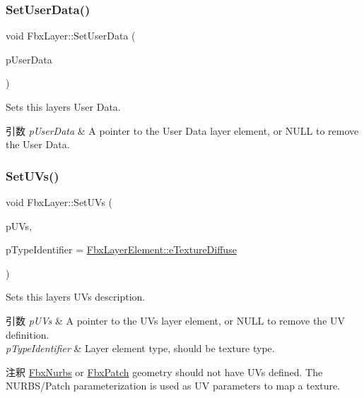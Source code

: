 \subsubsection{\texorpdfstring{Set\+User\+Data()}{SetUserData()}}
{\footnotesize\ttfamily void Fbx\+Layer\+::\+Set\+User\+Data (\begin{DoxyParamCaption}\item[{\hyperlink{class_fbx_layer_element_user_data}{Fbx\+Layer\+Element\+User\+Data} $\ast$}]{p\+User\+Data }\end{DoxyParamCaption})}

Sets this layer\textquotesingle{}s User Data. 
\begin{DoxyParams}{引数}
{\em p\+User\+Data} & A pointer to the User Data layer element, or {\ttfamily N\+U\+LL} to remove the User Data. \\
\hline
\end{DoxyParams}
\mbox{\label{class_fbx_layer_aa0032fabcc4b9a611bf014a14c5777ea}} 
\subsubsection{\texorpdfstring{Set\+U\+Vs()}{SetUVs()}}
{\footnotesize\ttfamily void Fbx\+Layer\+::\+Set\+U\+Vs (\begin{DoxyParamCaption}\item[{\hyperlink{class_fbx_layer_element_u_v}{Fbx\+Layer\+Element\+UV} $\ast$}]{p\+U\+Vs,  }\item[{\hyperlink{class_fbx_layer_element_a8c95c5cd880b56c776acd379bd86f42c}{Fbx\+Layer\+Element\+::\+E\+Type}}]{p\+Type\+Identifier = {\ttfamily \hyperlink{class_fbx_layer_element_a8c95c5cd880b56c776acd379bd86f42ca09829e6ecf512e7ae04d9ad8de1342fa}{Fbx\+Layer\+Element\+::e\+Texture\+Diffuse}} }\end{DoxyParamCaption})}

Sets this layer\textquotesingle{}s U\+Vs description. 
\begin{DoxyParams}{引数}
{\em p\+U\+Vs} & A pointer to the U\+Vs layer element, or {\ttfamily N\+U\+LL} to remove the UV definition. \\
\hline
{\em p\+Type\+Identifier} & Layer element type, should be texture type. \\
\hline
\end{DoxyParams}
\begin{DoxyRemark}{注釈}
\hyperlink{class_fbx_nurbs}{Fbx\+Nurbs} or \hyperlink{class_fbx_patch}{Fbx\+Patch} geometry should not have U\+Vs defined. The N\+U\+R\+B\+S/\+Patch parameterization is used as UV parameters to map a texture. 
\end{DoxyRemark}
\mbox{\label{class_fbx_layer_a2738cda132469cfdf112fa0d8f6fa32e}} 
